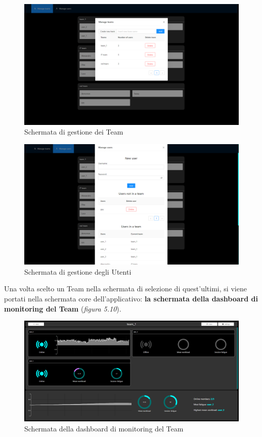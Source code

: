 \begin{figure}[H]
    \centering
    \includegraphics[width=1.0\textwidth]{img/dashboard_manage_teams_screenshot.png}
    \caption{Schermata di gestione dei Team}
\end{figure}
\begin{figure}[H]
    \centering
    \includegraphics[width=1.0\textwidth]{img/dashboard_users_global_screenshot.png}
    \caption{Schermata di gestione degli Utenti}
\end{figure}
Una volta scelto un Team nella schermata di selezione di quest'ultimi, si viene portati nella schermata core dell'applicativo: {\bf la schermata della dashboard di monitoring del Team} (\emph{figura 5.10}).\newline
\vspace{5mm}
\begin{figure}[H]
    \centering
    \includegraphics[width=1.0\textwidth]{img/dashboard_working_screenshot.png}
    \caption{Schermata della dashboard di monitoring del Team}
\end{figure}
